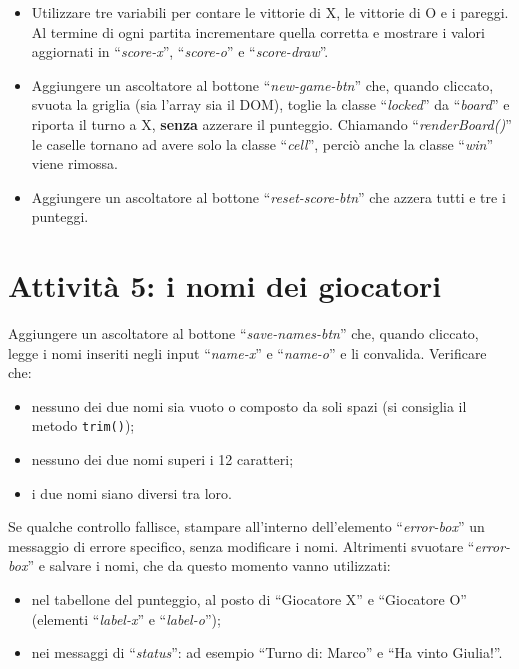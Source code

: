 \documentclass[a4paper,11pt]{article}
\newcommand{\elem}[1]{``\textit{#1}''}
\begin{document}
\begin{itemize}
    \item Utilizzare tre variabili per contare le vittorie di X, le vittorie di
    O e i pareggi. Al termine di ogni partita incrementare quella corretta e
    mostrare i valori aggiornati in \elem{score-x}, \elem{score-o} e
    \elem{score-draw}.
    \item Aggiungere un ascoltatore al bottone \elem{new-game-btn} che, quando
    cliccato, svuota la griglia (sia l'array sia il DOM), toglie la classe
    \elem{locked} da \elem{board} e riporta il turno a X, \textbf{senza}
    azzerare il punteggio. Chiamando \elem{renderBoard()} le caselle tornano
    ad avere solo la classe \elem{cell}, perciò anche la classe \elem{win}
    viene rimossa.
    \item Aggiungere un ascoltatore al bottone \elem{reset-score-btn} che azzera
    tutti e tre i punteggi.
\end{itemize}

\section*{Attività 5: i nomi dei giocatori}

Aggiungere un ascoltatore al bottone \elem{save-names-btn} che, quando cliccato,
legge i nomi inseriti negli input \elem{name-x} e \elem{name-o} e li convalida.
Verificare che:

\begin{itemize}
    \item[--] nessuno dei due nomi sia vuoto o composto da soli spazi (si
    consiglia il metodo \texttt{trim()});
    \item[--] nessuno dei due nomi superi i 12 caratteri;
    \item[--] i due nomi siano diversi tra loro.
\end{itemize}

Se qualche controllo fallisce, stampare all'interno dell'elemento
\elem{error-box} un messaggio di errore specifico, senza modificare i nomi.
Altrimenti svuotare \elem{error-box} e salvare i nomi, che da questo momento
vanno utilizzati:

\begin{itemize}
    \item nel tabellone del punteggio, al posto di ``Giocatore X'' e
    ``Giocatore O'' (elementi \elem{label-x} e \elem{label-o});
    \item nei messaggi di \elem{status}: ad esempio ``Turno di: Marco'' e
    ``Ha vinto Giulia!''.
\end{itemize}
\end{document}
